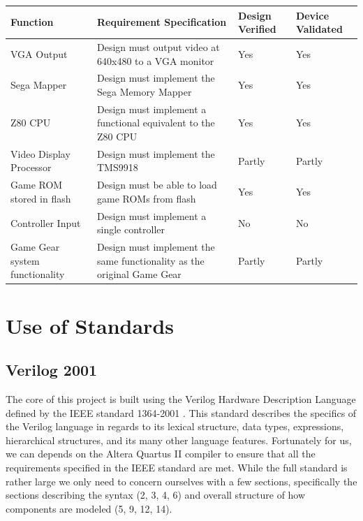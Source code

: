 \documentclass{article}
\begin{document}
\begin{tabular}{L{1.75in}L{2.75in}C{0.6in}C{0.7in}}
    \toprule
    \textbf{Function} & \textbf{Requirement Specification} & \textbf{Design Verified} & \textbf{Device Validated}\\
    \midrule
    VGA Output               & Design must output video at 640x480 to a VGA monitor & {\color{darkgreen} Yes}     & {\color{darkgreen} Yes} \\
    Sega Mapper              & Design must implement the Sega Memory Mapper         & {\color{darkgreen} Yes}     & {\color{darkgreen} Yes} \\
    Z80 CPU                  & Design must implement a functional equivalent to the Z80 CPU & {\color{darkgreen} Yes}     & {\color{darkgreen} Yes} \\
    Video Display Processor  & Design must implement the TMS9918                    & {\color{darkyellow} Partly} & {\color{darkyellow} Partly} \\
    Game ROM stored in flash & Design must be able to load game ROMs from flash     & {\color{darkgreen} Yes}     & {\color{darkgreen} Yes} \\
    Controller Input         & Design must implement a single controller            & {\color{darkred} No}        & {\color{darkred} No} \\
    Game Gear system functionality & Design must implement the same functionality as the original Game Gear & {\color{darkyellow}Partly} & {\color{darkyellow}Partly} \\
    \bottomrule
\end{tabular}

\section{Use of Standards}

\subsection{Verilog 2001}

The core of this project is built using the Verilog Hardware Description
Language defined by the IEEE standard 1364-2001 \cite{ieeeverilog}. This
standard describes the specifics of the Verilog language in regards to its
lexical structure, data types, expressions, hierarchical structures, and its
many other language features.  Fortunately for us, we can depends on the Altera
Quartus II compiler to ensure that all the requirements specified in the IEEE
standard are met. While the full standard is rather large we only need to
concern ourselves with a few sections, specifically the sections describing the
syntax (2, 3, 4, 6) and overall structure of how components are modeled (5, 9,
12, 14).
\end{document}
